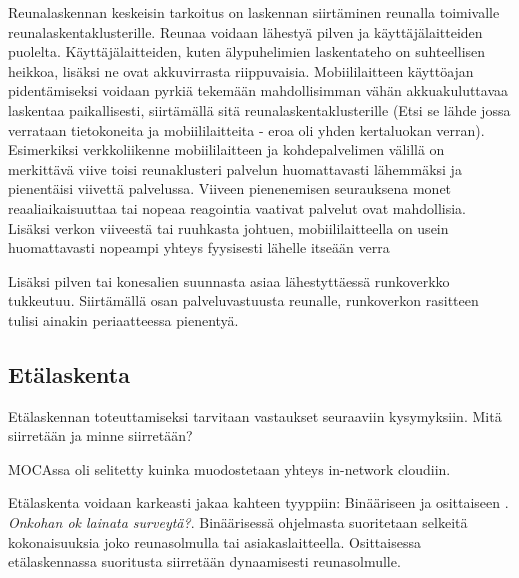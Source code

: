 \documentclass[finnish]{tktltiki2}
\theoremstyle{definition}
\theoremstyle{remark}
\begin{document}
Reunalaskennan keskeisin tarkoitus on laskennan siirtäminen reunalla toimivalle reunalaskentaklusterille. Reunaa voidaan lähestyä pilven ja käyttäjälaitteiden puolelta. Käyttäjälaitteiden, kuten älypuhelimien laskentateho on suhteellisen heikkoa, lisäksi ne ovat akkuvirrasta riippuvaisia. 
Mobiililaitteen käyttöajan pidentämiseksi voidaan pyrkiä tekemään mahdollisimman vähän akkuakuluttavaa laskentaa paikallisesti, siirtämällä sitä reunalaskentaklusterille (Etsi se lähde jossa verrataan tietokoneita ja mobiililaitteita - eroa oli yhden kertaluokan verran).
Esimerkiksi verkkoliikenne mobiililaitteen ja kohdepalvelimen välillä on merkittävä viive toisi reunaklusteri palvelun huomattavasti lähemmäksi ja pienentäisi viivettä palvelussa. Viiveen pienenemisen seurauksena monet reaaliaikaisuuttaa tai nopeaa reagointia vaativat palvelut ovat mahdollisia. Lisäksi verkon viiveestä tai ruuhkasta johtuen, mobiililaitteella on usein huomattavasti nopeampi yhteys fyysisesti lähelle itseään verra

Lisäksi pilven tai konesalien suunnasta asiaa lähestyttäessä runkoverkko tukkeutuu. Siirtämällä osan palveluvastuusta reunalle, runkoverkon rasitteen tulisi ainakin periaatteessa pienentyä. 


\subsection{Etälaskenta}
Etälaskennan toteuttamiseksi tarvitaan vastaukset seuraaviin kysymyksiin. Mitä siirretään ja minne siirretään?

MOCAssa oli selitetty kuinka muodostetaan yhteys in-network cloudiin.

Etälaskenta voidaan karkeasti jakaa kahteen tyyppiin: Binääriseen ja osittaiseen \cite{mao17}. \textit{Onkohan ok lainata surveytä?}. Binäärisessä ohjelmasta suoritetaan selkeitä kokonaisuuksia joko reunasolmulla tai asiakaslaitteella. Osittaisessa etälaskennassa suoritusta siirretään dynaamisesti reunasolmulle. 
\end{document}

